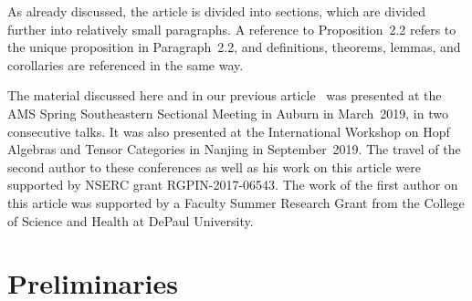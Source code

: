 \documentclass{article}
\numberwithin{equation}{section}
\theoremstyle{definition}
\theoremstyle{break}
\newcommand{\1}{{(1)}}
\newcommand{\2}{{(2)}}
\newcommand{\3}{{(3)}}
\begin{document}
As already discussed, the article is divided into sections, which are divided further into relatively small paragraphs. A reference to Proposition~2.2 refers to the unique proposition in Paragraph~2.2, and definitions, theorems, lemmas, and corollaries are referenced in the same way.

The material discussed here and in our previous article~\cite{KaSo2} was presented at the AMS Spring Southeastern Sectional Meeting in Auburn in March~2019, in two consecutive talks. It was also presented at the International Workshop on Hopf Algebras and Tensor Categories in Nanjing in September~2019. The travel of the second author to these conferences as well as his work on this article were supported by NSERC grant RGPIN-2017-06543. The work of the first author on this article was supported by a Faculty Summer Research Grant from the College of Science and Health at DePaul University.


\section{Preliminaries} \label{Sec:Prelim}
\end{document}
